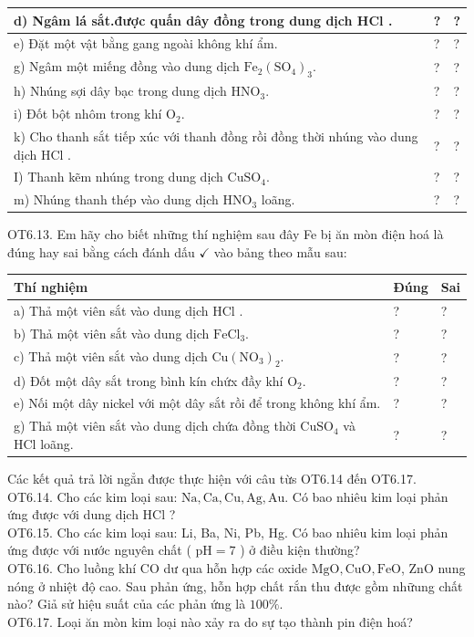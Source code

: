 \documentclass[10pt]{article}
\begin{document}
\begin{center}
\begin{tabular}{|l|l|l|}
\hline
d) Ngâm lá sắt.được quấn dây đồng trong dung dịch HCl . & ? & ? \\
\hline
e) Đặt một vật bằng gang ngoài không khí ẩm. & ? & ? \\
\hline
g) Ngâm một miếng đồng vào dung dịch $\mathrm{Fe}_{2}\left(\mathrm{SO}_{4}\right)_{3}$. & ? & ? \\
\hline
h) Nhúng sợi dây bạc trong dung dịch $\mathrm{HNO}_{3}$. & ? & ? \\
\hline
i) Đốt bột nhôm trong khí $\mathrm{O}_{2}$. & ? & ? \\
\hline
k) Cho thanh sắt tiếp xúc với thanh đồng rồi đồng thời nhúng vào dung dịch HCl . & ? & ? \\
\hline
I) Thanh kẽm nhúng trong dung dịch $\mathrm{CuSO}_{4}$. & ? & ? \\
\hline
m) Nhúng thanh thép vào dung dịch $\mathrm{HNO}_{3}$ loãng. & ? & ? \\
\hline
\end{tabular}
\end{center}

OT6.13. Em hãy cho biết những thí nghiệm sau đây Fe bị ăn mòn điện hoá là đúng hay sai bằng cách đánh dấu $\checkmark$ vào bảng theo mẫu sau:

\begin{center}
\begin{tabular}{|l|l|l|}
\hline
Thí nghiệm & Đúng & Sai \\
\hline
a) Thả một viên sắt vào dung dịch HCl . & ? & ? \\
\hline
b) Thả một viên sắt vào dung dịch $\mathrm{FeCl}_{3}$. & ? & ? \\
\hline
c) Thả một viên sắt vào dung dịch $\mathrm{Cu}\left(\mathrm{NO}_{3}\right)_{2}$. & ? & ? \\
\hline
d) Đốt một dây sắt trong bình kín chứx đầy khí $\mathrm{O}_{2}$. & ? & ? \\
\hline
e) Nối một dây nickel với một dây sắt rồi để trong không khí ẩm. & ? & ? \\
\hline
g) Thả một viên sắt vào dung dịch chứa đồng thời $\mathrm{CuSO}_{4}$ và HCl loãng. & ? & ? \\
\hline
\end{tabular}
\end{center}

Các kết quả trả lời ngẳn được thực hiện với câu từs OT6.14 đến OT6.17.\\
OT6.14. Cho các kim loại sau: $\mathrm{Na}, \mathrm{Ca}, \mathrm{Cu}, \mathrm{Ag}, \mathrm{Au}$. Có bao nhiêu kim loại phản ứng được với dung dịch HCl ?\\
OT6.15. Cho các kim loại sau: Li, Ba, Ni, Pb, Hg. Có bao nhiêu kim loại phản ứng được với nước nguyên chất ( $\mathrm{pH}=7$ ) ở điều kiện thường?\\
OT6.16. Cho luồng khí CO dư qua hỗn hợp các oxide $\mathrm{MgO}, \mathrm{CuO}, \mathrm{FeO}$, ZnO nung nóng ở nhiệt độ cao. Sau phản ứng, hỗn hợp chất rắn thu được gồm nhữung chất nào? Giả sử hiệu suất của các phản ứng là $100 \%$.\\
OT6.17. Loại ăn mòn kim loại nào xảy ra do sự tạo thành pin điện hoá?
\end{document}
